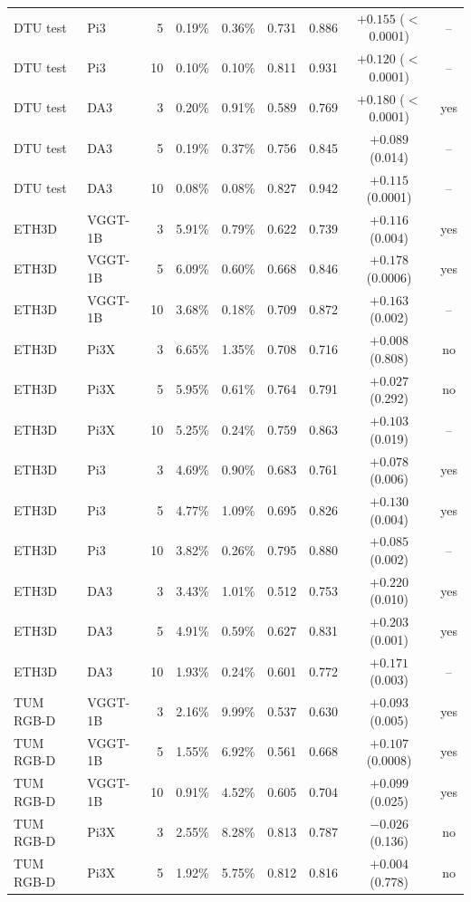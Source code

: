 \begin{tabular}{llrcccccc}
DTU test & Pi3 & 5 & 0.19\% & 0.36\% & 0.731 & 0.886 & $+0.155$ ($<$0.0001) & -- \\
DTU test & Pi3 & 10 & 0.10\% & 0.10\% & 0.811 & 0.931 & $+0.120$ ($<$0.0001) & -- \\
DTU test & DA3 & 3 & 0.20\% & 0.91\% & 0.589 & 0.769 & $+0.180$ ($<$0.0001) & yes \\
DTU test & DA3 & 5 & 0.19\% & 0.37\% & 0.756 & 0.845 & $+0.089$ (0.014) & -- \\
DTU test & DA3 & 10 & 0.08\% & 0.08\% & 0.827 & 0.942 & $+0.115$ (0.0001) & -- \\
\midrule
ETH3D & VGGT-1B & 3 & 5.91\% & 0.79\% & 0.622 & 0.739 & $+0.116$ (0.004) & yes \\
ETH3D & VGGT-1B & 5 & 6.09\% & 0.60\% & 0.668 & 0.846 & $+0.178$ (0.0006) & yes \\
ETH3D & VGGT-1B & 10 & 3.68\% & 0.18\% & 0.709 & 0.872 & $+0.163$ (0.002) & -- \\
ETH3D & Pi3X & 3 & 6.65\% & 1.35\% & 0.708 & 0.716 & $+0.008$ (0.808) & no \\
ETH3D & Pi3X & 5 & 5.95\% & 0.61\% & 0.764 & 0.791 & $+0.027$ (0.292) & no \\
ETH3D & Pi3X & 10 & 5.25\% & 0.24\% & 0.759 & 0.863 & $+0.103$ (0.019) & -- \\
ETH3D & Pi3 & 3 & 4.69\% & 0.90\% & 0.683 & 0.761 & $+0.078$ (0.006) & yes \\
ETH3D & Pi3 & 5 & 4.77\% & 1.09\% & 0.695 & 0.826 & $+0.130$ (0.004) & yes \\
ETH3D & Pi3 & 10 & 3.82\% & 0.26\% & 0.795 & 0.880 & $+0.085$ (0.002) & -- \\
ETH3D & DA3 & 3 & 3.43\% & 1.01\% & 0.512 & 0.753 & $+0.220$ (0.010) & yes \\
ETH3D & DA3 & 5 & 4.91\% & 0.59\% & 0.627 & 0.831 & $+0.203$ (0.001) & yes \\
ETH3D & DA3 & 10 & 1.93\% & 0.24\% & 0.601 & 0.772 & $+0.171$ (0.003) & -- \\
\midrule
TUM RGB-D & VGGT-1B & 3 & 2.16\% & 9.99\% & 0.537 & 0.630 & $+0.093$ (0.005) & yes \\
TUM RGB-D & VGGT-1B & 5 & 1.55\% & 6.92\% & 0.561 & 0.668 & $+0.107$ (0.0008) & yes \\
TUM RGB-D & VGGT-1B & 10 & 0.91\% & 4.52\% & 0.605 & 0.704 & $+0.099$ (0.025) & yes \\
TUM RGB-D & Pi3X & 3 & 2.55\% & 8.28\% & 0.813 & 0.787 & $-0.026$ (0.136) & no \\
TUM RGB-D & Pi3X & 5 & 1.92\% & 5.75\% & 0.812 & 0.816 & $+0.004$ (0.778) & no \\

\end{tabular}
